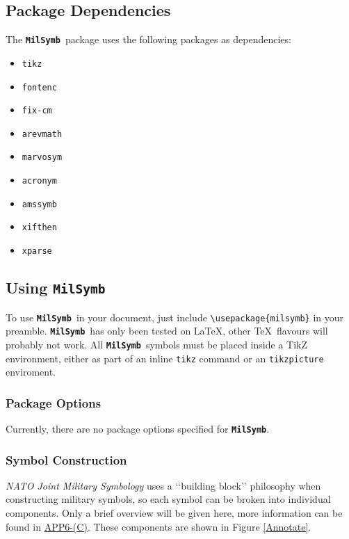 \documentclass[a4paper, titlepage]{article}
\newcommand\MilSymb{\textbf{\texttt{MilSymb}}}
\newcommand\DocLink{\href{https://www.awl.edu.pl/images/en/APP_6_C.pdf}{APP6-(C)}}
\begin{document}
\subsection{Package Dependencies}

The \MilSymb\  package uses the following packages as dependencies:

\begin{itemize}
\item \texttt{tikz}
\item \texttt{fontenc}
\item \texttt{fix-cm}
\item \texttt{arevmath}
\item \texttt{marvosym}
\item \texttt{acronym}
\item \texttt{amssymb}
\item \texttt{xifthen}
\item \texttt{xparse}
\end{itemize}

\subsection{Using \MilSymb}

To use \MilSymb\  in your document, just include \texttt{\textbackslash usepackage\{milsymb\}} in your preamble. \MilSymb\  has only been tested on \LaTeX, other \TeX\  flavours will probably not work. All \MilSymb\  symbols must be placed inside a TikZ environment, either as part of an inline \texttt{tikz} command or an \texttt{tikzpicture} enviroment. 

\subsubsection{Package Options}

Currently, there are no package options specified for \MilSymb.

\subsubsection{Symbol Construction}

\textit{NATO Joint Military Symbology} uses a \lq\lq{}building block\rq\rq{} philosophy when constructing military symbols, so each symbol can be broken into individual components. Only a brief overview will be given here, more information can be found in \DocLink. These components are shown in Figure \ref{Annotate}.
\end{document}
